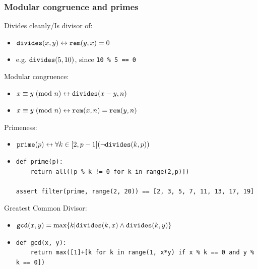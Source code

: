 \documentclass[aspectratio=169]{beamer}
\begin{document}
\begin{frame}[fragile]
\frametitle{Modular congruence and primes}
Divides cleanly/Is divisor of:
\begin{itemize}
\item $\verb|divides|(x, y) \leftrightarrow \verb|rem|(y, x) = 0$
\item e.g. $\verb|divides|(5, 10)$, since \verb|10 % 5 == 0|
\end{itemize}
Modular congruence:
\begin{itemize}
\item $x \equiv y\hspace{1mm}(\text{mod } n) \leftrightarrow \verb|divides|(x-y, n)$
\item $x \equiv y\hspace{1mm}(\text{mod } n) \leftrightarrow \verb|rem|(x, n) = \verb|rem|(y, n)$
\end{itemize}
Primeness:
\begin{itemize}
\item $\verb|prime|(p) \leftrightarrow \forall k \in [2, p-1](\neg\verb|divides|(k, p))$
\item \begin{Verbatim}[fontsize=\tiny]
def prime(p):
    return all([p % k != 0 for k in range(2,p)])

assert filter(prime, range(2, 20)) == [2, 3, 5, 7, 11, 13, 17, 19]
\end{Verbatim}
\end{itemize}
Greatest Common Divisor:
\begin{itemize}
\item $\verb|gcd|(x, y) = \text{max}\{ k | \verb|divides|(k, x) \land \verb|divides|(k, y)\}$
\item \begin{Verbatim}[fontsize=\tiny]
def gcd(x, y):
    return max([1]+[k for k in range(1, x*y) if x % k == 0 and y % k == 0])
\end{Verbatim}
\end{itemize}
\end{frame}
\end{document}
